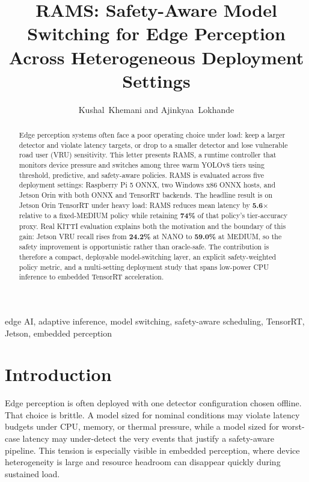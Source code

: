 \documentclass[10pt,journal]{IEEEtran}
\newcommand{\rams}{RAMS}
\begin{document}
\title{RAMS: Safety-Aware Model Switching for Edge Perception Across Heterogeneous Deployment Settings}

\author{Kushal~Khemani and Ajinkyaa~Lokhande}

\maketitle

\begin{abstract}
Edge perception systems often face a poor operating choice under load: keep a larger detector and violate latency targets, or drop to a smaller detector and lose vulnerable road user (VRU) sensitivity. This letter presents \rams{}, a runtime controller that monitors device pressure and switches among three warm YOLOv8 tiers using threshold, predictive, and safety-aware policies. \rams{} is evaluated across five deployment settings: Raspberry Pi 5 ONNX, two Windows x86 ONNX hosts, and Jetson Orin with both ONNX and TensorRT backends. The headline result is on Jetson Orin TensorRT under heavy load: \rams{} reduces mean latency by \textbf{5.6$\times$} relative to a fixed-MEDIUM policy while retaining \textbf{74\%} of that policy's tier-accuracy proxy. Real KITTI evaluation explains both the motivation and the boundary of this gain: Jetson VRU recall rises from \textbf{24.2\%} at NANO to \textbf{59.0\%} at MEDIUM, so the safety improvement is opportunistic rather than oracle-safe. The contribution is therefore a compact, deployable model-switching layer, an explicit safety-weighted policy metric, and a multi-setting deployment study that spans low-power CPU inference to embedded TensorRT acceleration.
\end{abstract}

\begin{IEEEkeywords}
edge AI, adaptive inference, model switching, safety-aware scheduling, TensorRT, Jetson, embedded perception
\end{IEEEkeywords}

\section{Introduction}
Edge perception is often deployed with one detector configuration chosen offline. That choice is brittle. A model sized for nominal conditions may violate latency budgets under CPU, memory, or thermal pressure, while a model sized for worst-case latency may under-detect the very events that justify a safety-aware pipeline. This tension is especially visible in embedded perception, where device heterogeneity is large and resource headroom can disappear quickly during sustained load.
\end{document}

